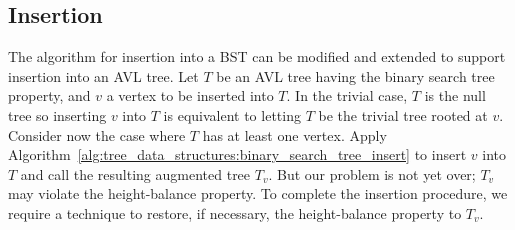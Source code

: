 
\subsection{Insertion}

The algorithm for insertion into a BST can be modified and extended to
support insertion into an AVL tree. Let $T$ be an AVL tree having the
binary search tree property, and
$v$ a vertex to be inserted into $T$. In the trivial case, $T$ is the
null tree so inserting $v$ into $T$ is equivalent to letting $T$ be
the trivial tree rooted at $v$. Consider now the case where $T$ has at
least one vertex. Apply
Algorithm~\ref{alg:tree_data_structures:binary_search_tree_insert} to
insert $v$ into $T$ and call the resulting augmented tree $T_v$. But
our problem is not yet over; $T_v$ may violate the height-balance
property. To complete the insertion procedure, we require a technique
to restore, if necessary, the height-balance property to $T_v$.

